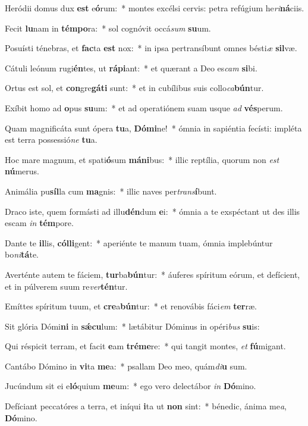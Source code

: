\item Heródii domus dux \textbf{est} e\textbf{ó}rum:~* montes excélsi cervis: petra refúgium he\textit{ri}\textbf{ná}ciis.
\item Fecit \textbf{lu}nam in \textbf{tém}\textbf{po}ra:~* sol cognóvit occá\textit{sum} \textbf{su}um.
\item Posuísti ténebras, et \textbf{fac}ta \textbf{est} nox:~* in ipsa pertransíbunt omnes bésti\textit{æ} \textbf{sil}væ.
\item Cátuli leónum rugi\textbf{én}tes, ut \textbf{rá}\textbf{pi}ant:~* et quærant a Deo es\textit{cam} \textbf{si}bi.
\item Ortus est sol, et \textbf{con}gre\textbf{gá}\textbf{ti} sunt:~* et in cubílibus suis collo\textit{ca}\textbf{bún}tur.
\item Exíbit homo ad \textbf{o}pus \textbf{su}um:~* et ad operatiónem suam usque \textit{ad} \textbf{vés}perum.
\item Quam magnificáta sunt ópera \textbf{tu}a, \textbf{Dó}\textbf{mi}ne!~* ómnia in sapiéntia fecísti: impléta est terra possessió\textit{ne} \textbf{tu}a.
\item Hoc mare magnum, et spati\textbf{ó}sum \textbf{má}\textbf{ni}bus:~* illic reptília, quorum non \textit{est} \textbf{nú}merus.
\item Animália pu\textbf{síl}la cum \textbf{ma}gnis:~* illic naves per\textit{trans}\textbf{í}bunt.
\item Draco iste, quem formásti ad illu\textbf{dén}dum \textbf{e}i:~* ómnia a te exspéctant ut des illis escam \textit{in} \textbf{tém}pore.
\item Dante te \textbf{il}lis, \textbf{cól}\textbf{li}gent:~* aperiénte te manum tuam, ómnia implebúntur bo\textit{ni}\textbf{tá}te.
\item Averténte autem te fáciem, \textbf{tur}ba\textbf{bún}tur:~* áuferes spíritum eórum, et defícient, et in púlverem suum re\textit{ver}\textbf{tén}tur.
\item Emíttes spíritum tuum, et \textbf{cre}a\textbf{bún}tur:~* et renovábis fáci\textit{em} \textbf{ter}ræ.
\item Sit glória Dómi\textbf{ni} in \textbf{sǽ}\textbf{cu}lum:~* lætábitur Dóminus in opéri\textit{bus} \textbf{su}is:
\item Qui réspicit terram, et facit \textbf{e}am \textbf{tré}\textbf{me}re:~* qui tangit montes, \textit{et} \textbf{fú}migant.
\item Cantábo Dómino in \textbf{vi}ta \textbf{me}a:~* psallam Deo meo, quám\textit{di}\textbf{u} sum.
\item Jucúndum sit ei e\textbf{ló}quium \textbf{me}um:~* ego vero delectábor \textit{in} \textbf{Dó}mino.
\item Defíciant peccatóres a terra, et iníqui \textbf{i}ta ut \textbf{non} sint:~* bénedic, ánima me\textit{a}, \textbf{Dó}mino.
